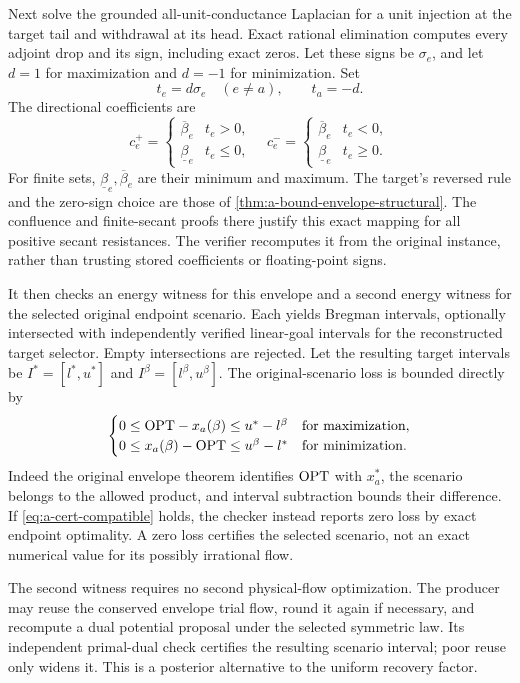 Next solve the grounded all-unit-conductance Laplacian for a unit
injection at the target tail and withdrawal at its head. Exact
rational elimination computes every adjoint drop and its sign,
including exact zeros. Let these signs be $\sigma_e$, and let
$d=1$ for maximization and $d=-1$ for minimization. Set
\[
 t_e=d\sigma_e\quad(e\ne a),\qquad t_a=-d.
\]
The directional coefficients are
\[
 c_e^+=\begin{cases}\overline\beta_e&t_e>0,\\
                         \underline\beta_e&t_e\le0,\end{cases}
 \quad
 c_e^-=\begin{cases}\overline\beta_e&t_e<0,\\
                         \underline\beta_e&t_e\ge0.\end{cases}
\]
For finite sets, $\underline\beta_e,\overline\beta_e$ are their
minimum and maximum. The target's reversed rule and the zero-sign
choice are those of \cref{thm:a-bound-envelope-structural}.
The confluence and finite-secant proofs there justify this exact
mapping for all positive secant resistances. The verifier recomputes
it from the original instance, rather than trusting stored coefficients
or floating-point signs.

It then checks an energy witness for this envelope and a second energy
witness for the selected original endpoint scenario. Each yields
Bregman intervals, optionally intersected with independently verified
linear-goal intervals for the reconstructed target selector. Empty
intersections are rejected. Let the resulting target intervals be
$I^*=[l^*,u^*]$ and $I^\beta=[l^\beta,u^\beta]$.
The original-scenario loss is bounded directly by
\begin{equation}
 \begin{cases}
 0\le\mathrm{OPT}-x_a(\beta)\le u^*-l^\beta&\text{for maximization},\\
 0\le x_a(\beta)-\mathrm{OPT}\le u^\beta-l^*&\text{for minimization}.
 \end{cases}
 \label{eq:a-cert-direct-loss}
\end{equation}
Indeed the original envelope theorem identifies $\mathrm{OPT}$ with $x_a^*$,
the scenario belongs to the allowed product, and interval subtraction
bounds their difference. If \eqref{eq:a-cert-compatible} holds, the
checker instead reports zero loss by exact endpoint optimality.
A zero loss certifies the selected scenario, not an exact numerical
value for its possibly irrational flow.

The second witness requires no second physical-flow optimization.
The producer may reuse the conserved envelope trial flow, round it
again if necessary, and recompute a dual potential proposal under the
selected symmetric law. Its independent primal-dual check certifies
the resulting scenario interval; poor reuse only widens it. This is a
posterior alternative to the uniform recovery factor.

